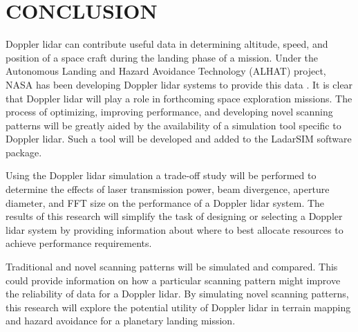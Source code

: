 \chapter{CONCLUSION}

Doppler lidar can contribute useful data in determining altitude, speed, 
and position of a space craft during the landing phase of a mission. Under the
Autonomous Landing and Hazard Avoidance Technology (ALHAT) project, NASA has 
been developing Doppler lidar systems to provide this data \cite{amz12fiber}. It is clear that
Doppler lidar will play a role in forthcoming space exploration missions. 
The process of optimizing, improving performance, and developing novel scanning patterns
will be greatly aided by the availability of a simulation tool specific to Doppler lidar. 
Such a tool will be developed and added to the LadarSIM software package. 

Using the Doppler lidar simulation a trade-off study will be performed to 
determine the effects of laser transmission power, beam divergence,
aperture diameter, and FFT size on the performance of a Doppler lidar system.
The results of this research will simplify the task of designing or selecting
a Doppler lidar system by providing information about where to best allocate
resources to achieve performance requirements. 

Traditional and novel scanning patterns will be simulated and compared. This could
provide information on how a particular scanning pattern might improve the reliability
of data for a Doppler lidar. By simulating novel scanning patterns, this research will 
explore the potential utility of Doppler lidar in terrain mapping and hazard avoidance
for a planetary landing mission. 



